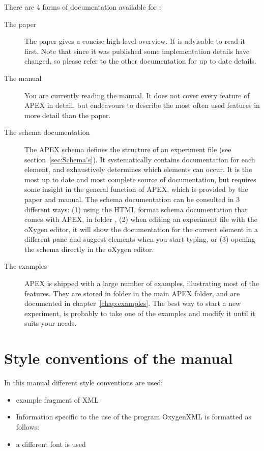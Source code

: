 There are 4 forms of documentation available for \apex:

\begin{description}
\item[The paper] The \apex paper gives a concise high level overview. It is advisable to read it first. Note that since it was published some implementation details have changed, so please refer to the other documentation for up to date details.
\item[The manual] You are currently reading the manual. It does not cover every feature of APEX in detail, but endeavours to describe the most often used features in more detail than the paper.
\item[The schema documentation] The APEX schema defines the structure of an experiment file (see section~\ref{sec:Schema's}). It systematically contains documentation for each element, and exhaustively determines which elements can occur. It is the most up to date and most complete source of documentation, but requires some insight in the general function of APEX, which is provided by the paper and manual. The schema documentation can be consulted in 3 different ways: (1) using the HTML format schema documentation that comes with APEX, in folder  , (2) when editing an experiment file with the oXygen editor, it will show the documentation for the current element in a different pane and suggest elements when you start typing, or (3) opening the schema  directly in the oXygen editor.
\item[The examples] APEX is shipped with a large number of examples, illustrating most of the features. They are stored in folder  in the main APEX folder, and are documented in chapter~\ref{chap:examples}. The best way to start a new experiment, is probably to take one of the examples and modify it until it suits your needs.
\end{description}


\section{Style conventions of the manual}
In this manual different style conventions are used:
\begin{itemize}
\item {} example fragment of XML

\item Information specific to the use of the program OxygenXML is
formatted as follows: 

\item a different font is used 
\end{itemize}


